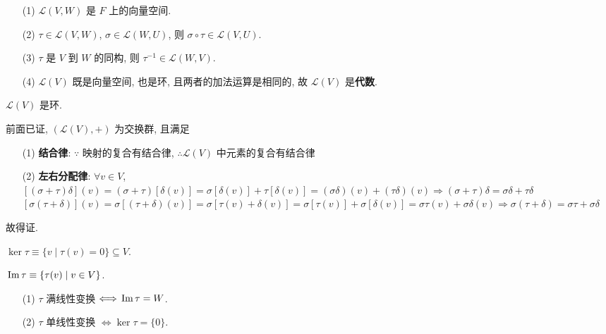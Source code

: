 \documentclass{note}
\begin{document}
\begin{thm}[(课本定理 2.1)]
    \begin{itemize}
        \item[(1)] $\mathcal{L}(V,W)$ 是 $F$ 上的向量空间.
        \item[(2)] $\tau\in\mathcal{L}(V,W)$, $\sigma\in\mathcal{L}(W,U)$, 则 $\sigma\circ\tau\in\mathcal{L}(V,U)$.
        \item[(3)] $\tau$ 是 $V$ 到 $W$ 的同构, 则 $\tau^{-1}\in\mathcal{L}(W,V)$.
        \item[(4)] $\mathcal{L}(V)$ 既是向量空间, 也是环, 且两者的加法运算是相同的, 故 $\mathcal{L}(V)$ 是\textbf{代数}.
    \end{itemize}
\end{thm}

$\mathcal{L}(V)$ 是环.
\begin{pf}
    前面已证, $(\mathcal{L}(V),+)$ 为交换群, 且满足
    \begin{itemize}
        \item[(1)] \textbf{结合律}: $\because$ 映射的复合有结合律, $\therefore\mathcal{L}(V)$ 中元素的复合有结合律
        \item[(2)] \textbf{左右分配律}: $\forall v\in V$, $[(\sigma+\tau)\delta](v)=(\sigma+\tau)[\delta(v)]=\sigma[\delta(v)]+\tau[\delta(v)]=(\sigma\delta)(v)+(\tau\delta)(v)\Longrightarrow(\sigma+\tau)\delta=\sigma\delta+\tau\delta$\\
        $[\sigma(\tau+\delta)](v)=\sigma[(\tau+\delta)(v)]=\sigma[\tau(v)+\delta(v)]=\sigma[\tau(v)]+\sigma[\delta(v)]=\sigma\tau(v)+\sigma\delta(v)\Longrightarrow\sigma(\tau+\delta)=\sigma\tau+\sigma\delta$
    \end{itemize}
    故得证.
\end{pf}

\begin{df}[核空间]
    $\ker\tau\equiv\{v\mid\tau(v)=0\}\subseteq V$.
\end{df}

\begin{df}[像空间]
    $\,\mathrm{Im}\,\tau\equiv\{\tau(v)\mid v\in V\}$.
\end{df}

\begin{thm}[(课本定理 2.3)]
    \begin{itemize}
        \item[(1)] $\tau$ 满线性变换 $\Longleftrightarrow\,\mathrm{Im}\,\tau=W$.
        \item[(2)] $\tau$ 单线性变换 $\Longleftrightarrow\ker\tau=\{0\}$.
    \end{itemize}
\end{thm}
\end{document}
